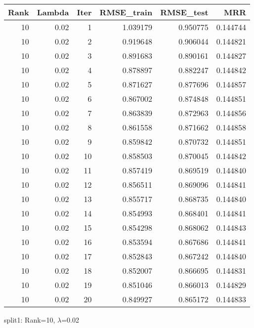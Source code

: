 \begin{tabular}{rrrrrr}
\toprule
 Rank &  Lambda &  Iter &  RMSE\_train &  RMSE\_test &       MRR \\
\midrule
   10 &    0.02 &     1 &    1.039179 &   0.950775 &  0.144744 \\
   10 &    0.02 &     2 &    0.919648 &   0.906044 &  0.144821 \\
   10 &    0.02 &     3 &    0.891683 &   0.890161 &  0.144827 \\
   10 &    0.02 &     4 &    0.878897 &   0.882247 &  0.144842 \\
   10 &    0.02 &     5 &    0.871627 &   0.877696 &  0.144857 \\
   10 &    0.02 &     6 &    0.867002 &   0.874848 &  0.144851 \\
   10 &    0.02 &     7 &    0.863839 &   0.872963 &  0.144856 \\
   10 &    0.02 &     8 &    0.861558 &   0.871662 &  0.144858 \\
   10 &    0.02 &     9 &    0.859842 &   0.870732 &  0.144851 \\
   10 &    0.02 &    10 &    0.858503 &   0.870045 &  0.144842 \\
   10 &    0.02 &    11 &    0.857419 &   0.869519 &  0.144840 \\
   10 &    0.02 &    12 &    0.856511 &   0.869096 &  0.144841 \\
   10 &    0.02 &    13 &    0.855717 &   0.868735 &  0.144840 \\
   10 &    0.02 &    14 &    0.854993 &   0.868401 &  0.144841 \\
   10 &    0.02 &    15 &    0.854298 &   0.868062 &  0.144843 \\
   10 &    0.02 &    16 &    0.853594 &   0.867686 &  0.144841 \\
   10 &    0.02 &    17 &    0.852843 &   0.867242 &  0.144840 \\
   10 &    0.02 &    18 &    0.852007 &   0.866695 &  0.144831 \\
   10 &    0.02 &    19 &    0.851046 &   0.866013 &  0.144829 \\
   10 &    0.02 &    20 &    0.849927 &   0.865172 &  0.144833 \\
\bottomrule
\end{tabular}

\caption{split1: Rank=10, $\lambda$=0.02}
